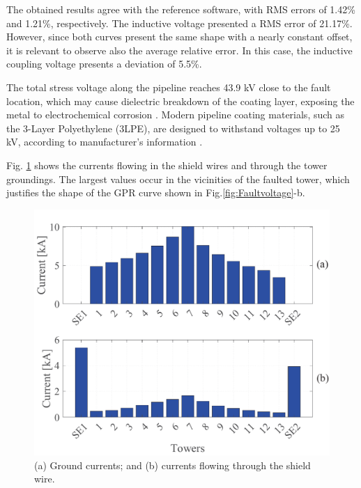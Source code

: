 \documentclass{IEEEtran4PSCC}
\begin{document}
The obtained results agree with the reference software, with RMS errors of 1.42\% and 1.21\%, respectively. The inductive  voltage presented a RMS error of 21.17\%. However, since both curves present the same shape with a nearly constant offset, it is relevant to observe also the average relative error. In this case, the inductive coupling voltage presents a deviation of 5.5\%.

The total stress voltage along the pipeline reaches 43.9 kV close to the fault location, which may cause dielectric breakdown of the coating layer, exposing the metal to electrochemical corrosion \cite{NACEInternational2007}. Modern pipeline coating materials, such as the 3-Layer Polyethylene (3LPE), are designed to withstand voltages up to 25 kV, according to manufacturer's information \cite{NACEInternational2007}.

Fig. \ref{fig:Faultcurrent} shows the currents flowing in the shield wires and through the tower groundings. The largest values occur in the vicinities of the faulted tower, which justifies the shape of the GPR curve shown in Fig.\ref{fig:Faultvoltage}-b.   

\begin{figure}[hbt]
	\begin{center}
		\includegraphics[width=1\columnwidth]{./fig/Fault_current2.pdf}
		\caption{(a) Ground currents; and (b) currents flowing through the shield wire.}
		\label{fig:Faultcurrent}
	\end{center}
\end{figure}
\end{document}
